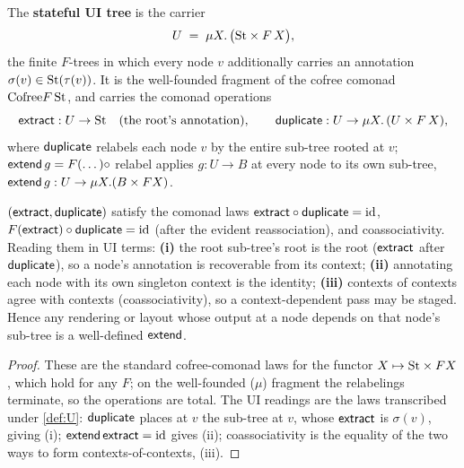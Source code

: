 \documentclass[../uxoxo-main]{subfiles}
\begin{document}
\begin{definition}\label{def:U}
The \textbf{stateful UI tree} is the carrier
\[
  U \;=\; \mu X.\,\bigl(\mathrm{St} \times F\,X\bigr),
\]
the finite $F$-trees in which every node $v$ additionally carries an annotation
$\sigma(v)\in\mathrm{St}(\tau(v))$. It is the well-founded fragment of the cofree comonad
$\mathrm{Cofree} F\,\mathrm{St}$, and carries the comonad operations
\[
  \mathsf{extract} : U\to\mathrm{St} \quad(\text{the root's annotation}),\qquad
  \mathsf{duplicate} : U \to \mu X.\,(U\times F\,X),
\]
where $\mathsf{duplicate}$ relabels each node $v$ by the entire sub-tree rooted at $v$;
$\mathsf{extend}\,g = F(\dots)\circ$ relabel applies $g:U\to B$ at every node to its own
sub-tree, $\mathsf{extend}\,g : U \to \mu X.(B\times FX)$.
\end{definition}

\begin{proposition}\label{prop:comonad}
$(\mathsf{extract},\mathsf{duplicate})$ satisfy the comonad laws
$\mathsf{extract}\circ\mathsf{duplicate}=\mathrm{id}$, $F(\mathsf{extract})\circ\mathsf{duplicate}=\mathrm{id}$ (after the
evident reassociation), and coassociativity. Reading them in UI terms:
\textbf{(i)} the root sub-tree's root is the root ($\mathsf{extract}$ after $\mathsf{duplicate}$),
so a node's annotation is recoverable from its context; \textbf{(ii)} annotating
each node with its own singleton context is the identity; \textbf{(iii)} contexts
of contexts agree with contexts (coassociativity), so a context-dependent pass may
be staged. Hence any rendering or layout whose output at a node depends on that
node's sub-tree is a well-defined $\mathsf{extend}$.
\end{proposition}

\begin{proof}
These are the standard cofree-comonad laws for the functor $X\mapsto\mathrm{St}\times FX$,
which hold for any $F$; on the well-founded ($\mu$) fragment the relabelings
terminate, so the operations are total. The UI readings are the laws transcribed
under \cref{def:U}: $\mathsf{duplicate}$ places at $v$ the sub-tree at $v$, whose
$\mathsf{extract}$ is $\sigma(v)$, giving (i); $\mathsf{extend}\,\mathsf{extract}=\mathrm{id}$ gives (ii);
coassociativity is the equality of the two ways to form contexts-of-contexts,
(iii).
\end{proof}
\end{document}
